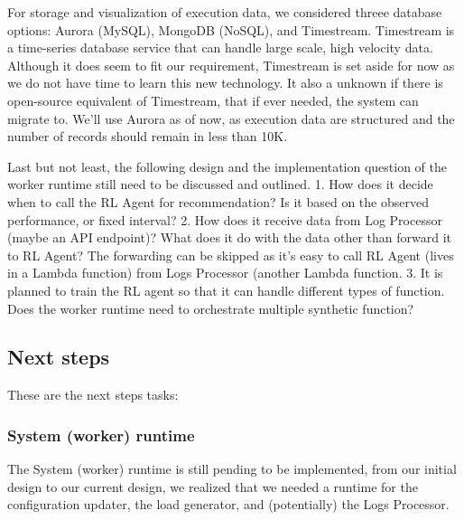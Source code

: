 \documentclass[conference]{IEEEtran}
\begin{document}
For storage and visualization of execution data, we considered threee database options: Aurora (MySQL), MongoDB (NoSQL), and Timestream. Timestream is a time-series database service that can handle large scale, high velocity data. Although it does seem to fit our requirement, Timestream is set aside for now as we do not have time to learn this new technology. It also a unknown if there is open-source equivalent of Timestream, that if ever needed, the system can migrate to. We'll use Aurora as of now, as execution data are structured and the number of records should remain in less than 10K.

Last but not least, the following design and the implementation question of the worker runtime still need to be discussed and outlined. 1. How does it decide when to call the RL Agent for recommendation? Is it based on the observed performance, or fixed interval? 2. How does it receive data from Log Processor (maybe an API endpoint)? What does it do with the data other than forward it to RL Agent? The forwarding can be skipped as it's easy to call RL Agent (lives in a Lambda function) from Logs Processor (another Lambda function. 3. It is planned to train the RL agent so that it can handle different types of function. Does the worker runtime need to orchestrate multiple synthetic function?

\subsection{Next steps}

These are the next steps tasks:

\subsubsection{System (worker) runtime}

The System (worker) runtime is still pending to be implemented, from our initial design to our current design, we realized that we needed a runtime for the configuration updater, the load generator, and (potentially) the Logs Processor.
\end{document}
